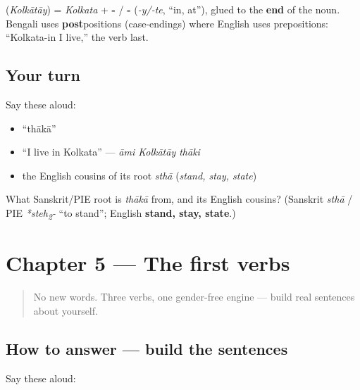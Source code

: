 \begin{grammarlens}[title={Grammar Lens: \textquotedblleft{}in\textquotedblright{} comes after the noun}]
\textbf{} (\emph{Kolkātāy}) = \emph{Kolkata} + \textbf{-} / \textbf{-} (\emph{-y/-te}, \textquotedblleft{}in, at\textquotedblright{}), glued to the \textbf{end} of the noun. Bengali uses \textbf{post}positions (case-endings) where English uses prepositions: \textquotedblleft{}Kolkata-in I live,\textquotedblright{} the verb last.
\end{grammarlens}

\subsection*{Your turn}
Say these aloud:

\begin{itemize}
\raggedright
  \item \textquotedblleft{}thākā\textquotedblright{}
  \item \textquotedblleft{}I live in Kolkata\textquotedblright{} — \emph{āmi Kolkātāy thāki}
  \item the English cousins of its root \emph{sthā} (\emph{stand, stay, state})
\end{itemize}

\begin{tcolorbox}[breakable,colback=teal!4,colframe=teal!35!black,title={Before you move on}]
What Sanskrit/PIE root is \emph{thākā} from, and its English cousins? (Sanskrit \emph{sthā} / PIE \emph{*steh\textsubscript{2}-} \textquotedblleft{}to stand\textquotedblright{}; English \textbf{stand, stay, state}.)
\end{tcolorbox}
\section[Practice]{Chapter 5 — The first verbs}

\label{lesson:BN-C05-practice}



\begin{quote}
No new words. Three verbs, one gender-free engine — build real sentences about yourself.
\end{quote}

\subsection*{How to answer — build the sentences}
Say these aloud:

